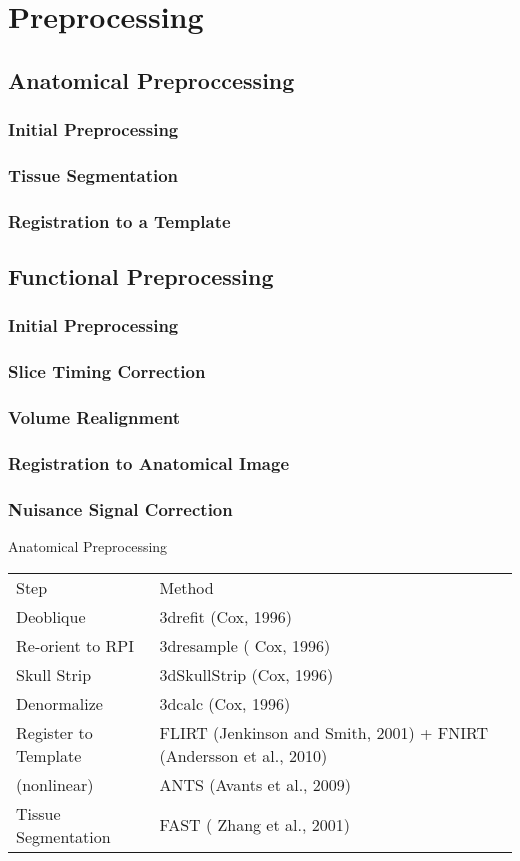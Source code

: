 \section*{Preprocessing}
\subsection{Anatomical Preproccessing}
\subsubsection{Initial Preprocessing}
\subsubsection{Tissue Segmentation}
\subsubsection{Registration to a Template}
\subsection{Functional Preprocessing}
\subsubsection{Initial Preprocessing}
\subsubsection{Slice Timing Correction}
\subsubsection{Volume Realignment}
\subsubsection{Registration to Anatomical Image}
\subsubsection{Nuisance Signal Correction}

Anatomical Preprocessing \\

\begin{tabular}{| l | l |}
	\hline
	Step & Method  \\
	Deoblique & 3drefit (Cox, 1996)  \\
	Re-orient to RPI & 3dresample ( Cox, 1996) \\
	Skull Strip & 3dSkullStrip (Cox, 1996) \\
	Denormalize & 3dcalc (Cox, 1996) \\
	Register to Template & FLIRT (Jenkinson and Smith, 2001) + FNIRT (Andersson et al., 2010) \\
	(nonlinear) & ANTS (Avants et al., 2009)  \\
	Tissue Segmentation & FAST ( Zhang et al., 2001)\\ 
	\hline
\end{tabular}

